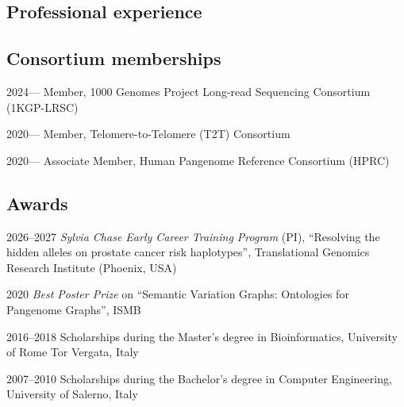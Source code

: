 \documentclass[oneside,11pt,a4paper,nologo]{book}
\newcommand{\publications}{1}
\renewcommand{\emph}[1]{{\it #1}}
\begin{document}
\subsection*{Professional experience}



\subsection*{Consortium memberships}

2024--- Member, 1000 Genomes Project Long-read Sequencing Consortium (1KGP-LRSC)~\href{https://millerlaboratory.com/1KGP-LRS.html}{}

2020--- Member, Telomere-to-Telomere (T2T) Consortium~\href{https://sites.google.com/ucsc.edu/t2tworkinggroup}{}

2020--- Associate Member, Human Pangenome Reference Consortium (HPRC)~\href{https://humanpangenome.org/}{}

\subsection*{Awards}

2026--2027 \emph{Sylvia Chase Early Career Training Program} (PI), ``Resolving the hidden alleles on prostate cancer risk haplotypes'', Translational Genomics Research Institute (Phoenix, USA)

2020 \emph{Best Poster Prize} on ``Semantic Variation Graphs: Ontologies for Pangenome Graphs'', ISMB~\href{https://www.iscb.org/ismb2020-general/ismb2020-award-winners\#bio-poster}{}

2016--2018 Scholarships during the Master’s degree in Bioinformatics, University of Rome Tor Vergata, Italy

2007--2010 Scholarships during the Bachelor’s degree in Computer Engineering, University of Salerno, Italy




\ifdef{\publications}{

\subsection*{Publications}



}
\end{document}
